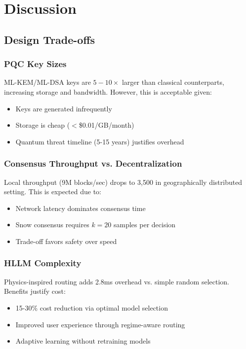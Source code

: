 \documentclass[11pt,twocolumn]{article}
\begin{document}
\section{Discussion}

\subsection{Design Trade-offs}

\subsubsection{PQC Key Sizes}

ML-KEM/ML-DSA keys are $5-10\times$ larger than classical counterparts, increasing storage and bandwidth. However, this is acceptable given:
\begin{itemize}
\item Keys are generated infrequently
\item Storage is cheap ($<$\$0.01/GB/month)
\item Quantum threat timeline (5-15 years) justifies overhead
\end{itemize}

\subsubsection{Consensus Throughput vs. Decentralization}

Local throughput (9M blocks/sec) drops to 3,500 in geographically distributed setting. This is expected due to:
\begin{itemize}
\item Network latency dominates consensus time
\item Snow consensus requires $k=20$ samples per decision
\item Trade-off favors safety over speed
\end{itemize}

\subsubsection{HLLM Complexity}

Physics-inspired routing adds 2.8ms overhead vs. simple random selection. Benefits justify cost:
\begin{itemize}
\item 15-30\% cost reduction via optimal model selection
\item Improved user experience through regime-aware routing
\item Adaptive learning without retraining models
\end{itemize}
\end{document}
